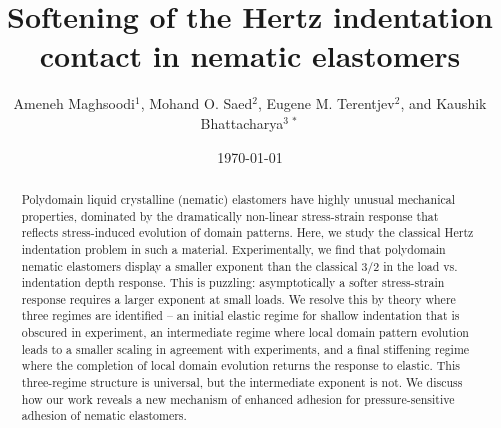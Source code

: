 \documentclass[12pt]{article}
\begin{document}
\title{Softening of the Hertz indentation contact in nematic elastomers}  
\author{Ameneh Maghsoodi$^{1}$, Mohand O. Saed$^{2}$, Eugene M. Terentjev$^{2}$, and Kaushik Bhattacharya$^{3 \ *}$}
\date{\today}

\maketitle

\begin{abstract}
\noindent Polydomain liquid crystalline (nematic) elastomers have highly unusual mechanical properties, dominated by the dramatically non-linear stress-strain response that reflects stress-induced evolution of domain patterns. Here, we study the classical Hertz indentation problem in such a material.  Experimentally, we find that polydomain nematic elastomers display a smaller exponent than the classical 3/2 in the load vs. indentation depth response.  This is puzzling: asymptotically a softer stress-strain response requires a larger exponent at small loads. We resolve this by theory where three regimes are identified -- an  initial elastic regime for shallow indentation that is obscured in experiment, an intermediate regime where local domain pattern evolution leads to a smaller scaling in agreement with experiments, and a final stiffening regime where the completion of local domain evolution returns the response to elastic.  This three-regime structure is universal, but the intermediate exponent is not.  We discuss how our work reveals a new mechanism of enhanced adhesion for pressure-sensitive adhesion of nematic elastomers.
\end{abstract}
\end{document}
